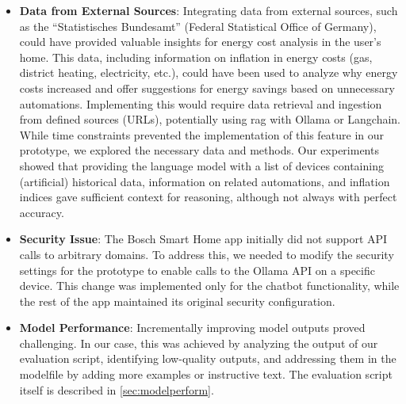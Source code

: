 \begin{itemize}
    \item \textbf{Data from External Sources}: Integrating data from external sources, such as the ``Statistisches Bundesamt'' (Federal Statistical Office of Germany), could have provided valuable insights for energy cost analysis in the user's home. This data, including information on inflation in energy costs (gas, district heating, electricity, etc.), could have been used to analyze why energy costs increased and offer suggestions for energy savings based on unnecessary automations. Implementing this would require data retrieval and ingestion from defined sources (URLs), potentially using \gls{rag} with Ollama or Langchain. While time constraints prevented the implementation of this feature in our prototype, we explored the necessary data and methods. Our experiments showed that providing the language model with a list of devices containing (artificial) historical data, information on related automations, and inflation indices gave sufficient context for reasoning, although not always with perfect accuracy.
    
    \item \textbf{Security Issue}: The Bosch Smart Home app initially did not support API calls to arbitrary domains. To address this, we needed to modify the security settings for the prototype to enable calls to the Ollama API on a specific device. This change was implemented only for the chatbot functionality, while the rest of the app maintained its original security configuration.

    \item \textbf{Model Performance}: Incrementally improving model outputs proved challenging. In our case, this was achieved by analyzing the output of our evaluation script, identifying low-quality outputs, and addressing them in the modelfile by adding more examples or instructive text. The evaluation script itself is described in \cref{sec:modelperform}.
\end{itemize}
